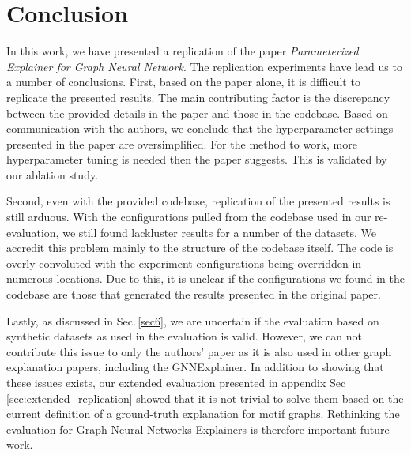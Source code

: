 \section{Conclusion}\label{sec:conclusion}
In this work, we have presented a replication of the paper \textit{Parameterized Explainer for Graph Neural Network}. The replication experiments have lead us to a number of conclusions. First, based on the paper alone, it is difficult to replicate the presented results. The main contributing factor is the discrepancy between the provided details in the paper and those in the codebase. Based on communication with the authors, we conclude that the hyperparameter settings presented in the paper are oversimplified. For the method to work, more hyperparameter tuning is needed then the paper suggests. This is validated by our ablation study.

Second, even with the provided codebase, replication of the presented results is still arduous. With the configurations pulled from the codebase used in our re-evaluation, we still found lackluster results for a number of the datasets. We accredit this problem mainly to the structure of the codebase itself. The code is overly convoluted with the experiment configurations being overridden in numerous locations. Due to this, it is unclear if the configurations we found in the codebase are those that generated the results presented in the original paper. 

Lastly, as discussed in Sec.\,\ref{sec6}, we are uncertain if the evaluation based on synthetic datasets as used in the evaluation is valid. However, we can not contribute this issue to only the authors' paper as it is also used in other graph explanation papers, including the GNNExplainer. In addition to showing that these issues exists, our extended evaluation presented in appendix Sec\,\ref{sec:extended_replication} showed that it is not trivial to solve them based on the current definition of a ground-truth explanation for motif graphs. Rethinking the evaluation for Graph Neural Networks Explainers is therefore important future work. 


